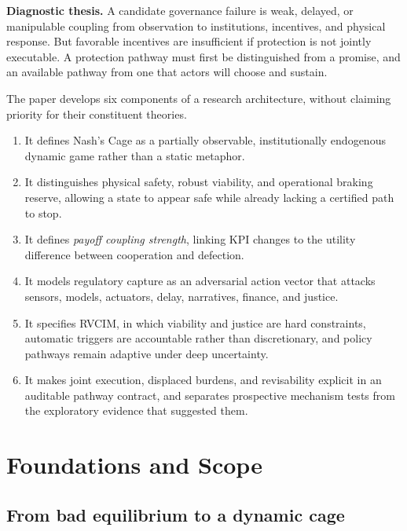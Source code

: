 \documentclass[11pt,a4paper]{article}
\numberwithin{equation}{section}
\theoremstyle{definition}
\theoremstyle{plain}
\theoremstyle{remark}
\newcommand{\RVCIM}{\textsc{RVCIM}}
\begin{document}
\begin{corebox}
\textbf{Diagnostic thesis.} A candidate governance failure is weak, delayed, or manipulable coupling from observation to institutions, incentives, and physical response. But favorable incentives are insufficient if protection is not jointly executable. A protection pathway must first be distinguished from a promise, and an available pathway from one that actors will choose and sustain.
\end{corebox}

The paper develops six components of a research architecture, without claiming priority for their constituent theories.

\begin{enumerate}
  \item It defines Nash's Cage as a partially observable, institutionally endogenous dynamic game rather than a static metaphor.
  \item It distinguishes physical safety, robust viability, and operational braking reserve, allowing a state to appear safe while already lacking a certified path to stop.
  \item It defines \emph{payoff coupling strength}, linking KPI changes to the utility difference between cooperation and defection.
  \item It models regulatory capture as an adversarial action vector that attacks sensors, models, actuators, delay, narratives, finance, and justice.
  \item It specifies \RVCIM, in which viability and justice are hard constraints, automatic triggers are accountable rather than discretionary, and policy pathways remain adaptive under deep uncertainty.
  \item It makes joint execution, displaced burdens, and revisability explicit in an auditable pathway contract, and separates prospective mechanism tests from the exploratory evidence that suggested them.
\end{enumerate}

\section{Foundations and Scope}

\subsection{From bad equilibrium to a dynamic cage}
\end{document}
